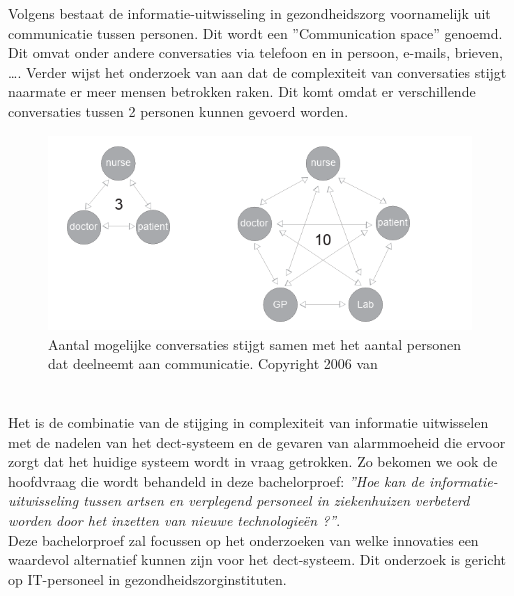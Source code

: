 Volgens \textcite{Coiera2006} bestaat de informatie-uitwisseling in gezondheidszorg voornamelijk uit communicatie tussen personen. Dit wordt een ''Communication space'' genoemd. Dit omvat onder andere conversaties via telefoon en in persoon, e-mails, brieven, \ldots . Verder wijst het onderzoek van \textcite{Coiera2006} aan dat de complexiteit van conversaties stijgt naarmate er meer mensen betrokken raken. Dit komt omdat er verschillende conversaties tussen 2 personen kunnen gevoerd worden.

\begin{figure}[H]
  \includegraphics[width=\linewidth]{../graphics/Number-of-conversations.png}
  \caption{Aantal mogelijke conversaties stijgt samen met het aantal personen dat deelneemt aan communicatie. \autocite[Uit ''Communication Systems in Healthcare'' door][The Clinical Biochemist Reviews, 27(2) , 90.]{Coiera2006} Copyright 2006 van \textcite{Coiera2006}}
  \label{fig:aantal conversaties}
\end{figure}

\section{}%
\label{sec:onderzoeksvraag}

Het is de combinatie van de stijging in complexiteit van informatie uitwisselen met de nadelen van het \gls{dect}-systeem en de gevaren van alarmmoeheid die ervoor zorgt dat het huidige systeem wordt in vraag getrokken. Zo bekomen we ook de hoofdvraag die wordt behandeld in deze bachelorproef: \textit{''Hoe kan de informatie-uitwisseling tussen artsen en verplegend personeel in ziekenhuizen verbeterd worden door het inzetten van nieuwe technologieën ?''}.\\
Deze bachelorproef zal focussen op het onderzoeken van welke innovaties een waardevol alternatief kunnen zijn voor het \gls{dect}-systeem. Dit onderzoek is gericht op IT-personeel in gezondheidszorginstituten.\\\\

